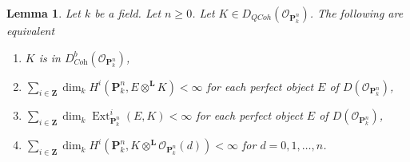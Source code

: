 \documentclass{stacks-project}
\theoremstyle{plain}
\newtheorem{lemma}[subsection]{Lemma}
\theoremstyle{definition}
\theoremstyle{remark}
\numberwithin{equation}{subsection}
\def\Ext{\mathop{\mathrm{Ext}}\nolimits}
\def\QCoh{\mathit{QCoh}}
\begin{document}
\begin{lemma}
\label{lemma-coherent-on-projective-space}
Let $k$ be a field. Let $n \geq 0$. Let
$K \in D_\QCoh(\mathcal{O}_{\mathbf{P}^n_k})$.
The following are equivalent
\begin{enumerate}
\item $K$ is in $D^b_{\textit{Coh}}(\mathcal{O}_{\mathbf{P}^n_k})$,
\item $\sum_{i \in \mathbf{Z}}
\dim_k H^i(\mathbf{P}^n_k, E \otimes^\mathbf{L} K) < \infty$
for each perfect object $E$ of
$D(\mathcal{O}_{\mathbf{P}^n_k})$,
\item $\sum_{i \in \mathbf{Z}}
\dim_k \Ext^i_{\mathbf{P}^n_k}(E, K) < \infty$
for each perfect object $E$ of $D(\mathcal{O}_{\mathbf{P}^n_k})$,
\item $\sum_{i \in \mathbf{Z}} \dim_k H^i(\mathbf{P}^n_k,
K \otimes^\mathbf{L} \mathcal{O}_{\mathbf{P}^n_k}(d)) < \infty$
for $d = 0, 1, \ldots, n$.
\end{enumerate}
\end{lemma}
\end{document}
